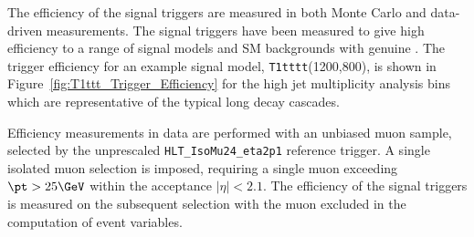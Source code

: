 



The efficiency of the signal triggers are measured in both Monte Carlo and data-driven measurements.
The signal triggers have been measured to give high efficiency to a range of signal models and SM 
backgrounds with genuine \met. The trigger efficiency for an example signal model, \texttt{T1tttt}(1200,800), 
is shown in Figure~\ref{fig:T1ttt_Trigger_Efficiency} for the high jet multiplicity analysis bins which are 
representative of the typical long decay cascades.

Efficiency measurements in data are performed with an unbiased muon sample, selected by the unprescaled \verb!HLT_IsoMu24_eta2p1! 
reference trigger. A single isolated muon selection is imposed, requiring a single muon exceeding $\pt > 25 \GeV$ 
within the acceptance $|\eta| < 2.1$. The efficiency of the signal triggers is measured on the subsequent selection 
with the muon excluded in the computation of event variables.




